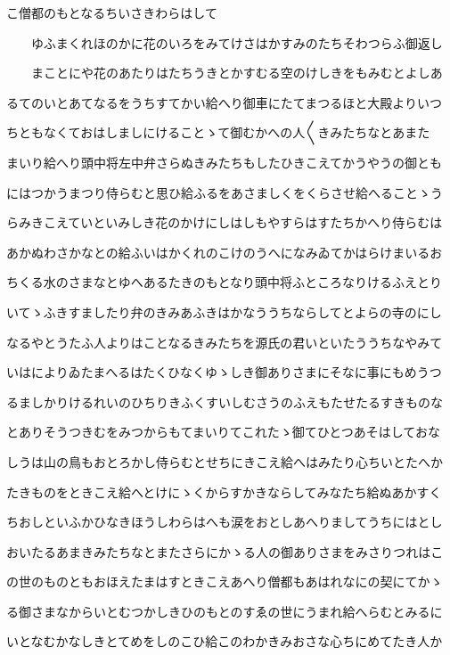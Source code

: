 \documentclass[a4paper,11pt,landscape]{ltjtarticle}
\begin{document}
こ僧都のもとなるちいさきわらはして
\par\medskip
　　ゆふまくれほのかに花のいろをみてけさはかすみのたちそわつらふ御返し
\par\medskip
　　まことにや花のあたりはたちうきとかすむる空のけしきをもみむとよしあ
\par\medskip
るてのいとあてなるをうちすてかい給へり御車にたてまつるほと大殿よりいつ
\par\medskip
ちともなくておはしましにけることゝて御むかへの人〱きみたちなとあまた
\par\medskip
まいり給へり頭中将左中弁さらぬきみたちもしたひきこえてかうやうの御とも
\par\medskip
にはつかうまつり侍らむと思ひ給ふるをあさましくをくらさせ給へることゝう
\par\medskip
らみきこえていといみしき花のかけにしはしもやすらはすたちかへり侍らむは
\par\medskip
あかぬわさかなとの給ふいはかくれのこけのうへになみゐてかはらけまいるお
\par\medskip
ちくる水のさまなとゆへあるたきのもとなり頭中将ふところなりけるふえとり
\par\medskip
いてゝふきすましたり弁のきみあふきはかなううちならしてとよらの寺のにし
\par\medskip
なるやとうたふ人よりはことなるきみたちを源氏の君いといたううちなやみて
\par\medskip
いはによりゐたまへるはたくひなくゆゝしき御ありさまにそなに事にもめうつ
\par\medskip
るましかりけるれいのひちりきふくすいしむさうのふえもたせたるすきものな
\par\medskip
とありそうつきむをみつからもてまいりてこれたゝ御てひとつあそはしておな
\par\medskip
しうは山の鳥もおとろかし侍らむとせちにきこえ給へはみたり心ちいとたへか
\par\medskip
たきものをときこえ給へとけにゝくからすかきならしてみなたち給ぬあかすく
\par\medskip
ちおしといふかひなきほうしわらはへも涙をおとしあへりましてうちにはとし
\par\medskip
おいたるあまきみたちなとまたさらにかゝる人の御ありさまをみさりつれはこ
\par\medskip
の世のものともおほえたまはすときこえあへり僧都もあはれなにの契にてかゝ
\par\medskip
る御さまなからいとむつかしきひのもとのすゑの世にうまれ給へらむとみるに
\par\medskip
いとなむかなしきとてめをしのこひ給このわかきみおさな心ちにめてたき人か
\end{document}
